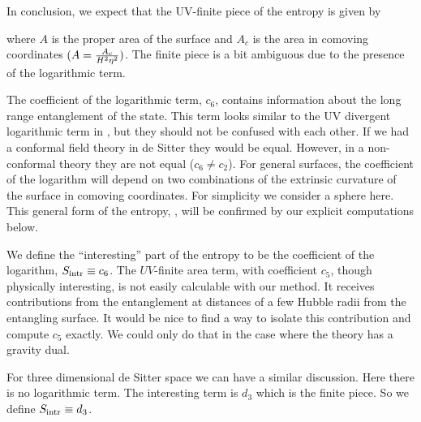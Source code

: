 In conclusion, we expect that the UV-finite piece of the entropy is given by

\eqn{}
where $A$ is the proper area of the surface and $A_c$ is the area in comoving coordinates $(A = {A_c \over
H^2 \eta^2 })$. The finite piece is a bit ambiguous due to the presence of the logarithmic term.

The coefficient of the logarithmic term, $c_6$, contains information about the long range entanglement
of the state. This term looks similar to the UV divergent logarithmic term in \entuv , but they should
not be confused with each other. If we had a conformal field theory in de Sitter they would be equal.
However, in a non-conformal theory they are not equal ($c_6 \not = c_2$).
 For general surfaces, the coefficient of the logarithm will
depend on two combinations of  the extrinsic curvature of the surface in comoving coordinates. For simplicity we consider  a
sphere here. This general form of the entropy, \entir , will be
confirmed by our explicit computations below. 

We define the ``interesting'' part of the 
entropy to be the coefficient of the logarithm, $S_{\rm intr} \equiv c_6$. The $UV$-finite area term, with coefficient $c_5$, though physically interesting, is not easily  calculable with our method. It receives 
contributions from the entanglement at distances of a few Hubble radii from the entangling surface. 
 It would be nice to find a way to isolate this contribution and compute $c_5$ exactly. We could only do that in the case where the theory has a gravity dual.


For three dimensional de Sitter space we can have  a similar discussion.
\eqn{}
Here there is no logarithmic term. The interesting term is $d_3$ which is the finite piece.
So we define $S_{\rm intr} \equiv d_3$.

